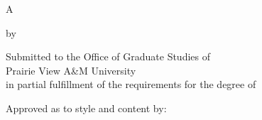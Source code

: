 %
%
%


\begin{titlepage}
\begin{center}

\vspace*{16 pt}
\MakeUppercase{\pvamumanuscripttitle}

\vspace{30 pt}
A \pvamupapertype

by

\MakeUppercase{\pvamufullname}

\vspace{30 pt}

\begin{singlespace}
Submitted to the Office of Graduate Studies of \\
Prairie View A\&M University \\
in partial fulfillment of the requirements for the degree of\\
\end{singlespace}

\vspace{16 pt}
\MakeUppercase{\pvamudegree}

\vspace{16 pt}

\end{center}

\begin{singlespace}
\hspace*{1ex} Approved as to style and content by:
\vspace{16 pt}
\newcommand{\specialcell}[2][l]{%
  \begin{tabular}[#1]{@{}l@{}}#2\end{tabular}}


\end{singlespace}
\end{titlepage}
